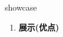 
\begin{frame}
{\huge showcase}
\begin{center}
\begin{enumerate}\Large
  \item \textbf{展示(优点)}
\end{enumerate}
\end{center}
\end{frame}
